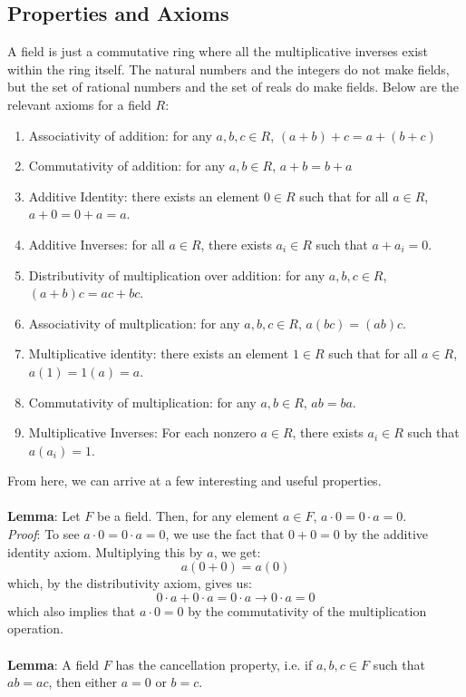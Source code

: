 \documentclass[11pt]{report}
\begin{document}
\subsection{Properties and Axioms}
A field is just a commutative ring where all the multiplicative inverses exist within the ring itself. The natural numbers and the integers do not make fields, but the set of rational numbers and the set of reals do make fields. Below are the relevant axioms for a field $R$:
\begin{enumerate}
\item Associativity of addition: for any $a,b,c \in R$, $(a+b)+c = a+(b+c)$
\item Commutativity of addition: for any $a,b \in R$, $a+b = b+a$
\item Additive Identity: there exists an element $0 \in R$ such that for all $a \in R$, $a + 0 = 0 + a = a$.
\item Additive Inverses: for all $a \in R$, there exists $a_i \in R$ such that $a + a_i = 0$.
\item Distributivity of multiplication over addition: for any $a,b,c \in R$, $(a+b)c = ac + bc$.
\item Associativity of multplication: for any $a,b,c \in R$, $a(bc)=(ab)c$.
\item Multiplicative identity: there exists an element $1 \in R$ such that for all $a \in R$, $a(1) = 1(a) = a$.
\item Commutativity of multiplication: for any $a,b \in R$, $ab = ba$.
\item Multiplicative Inverses: For each nonzero $a \in R$, there exists $a_i \in R$ such that $a(a_i) = 1$.
\end{enumerate}
From here, we can arrive at a few interesting and useful properties. \\ \pagebreak
\\ 
\textbf{Lemma}: Let $F$ be a field. Then, for any element $a \in F$, $a \cdot 0 = 0 \cdot a = 0$. \\
\textit{Proof}: To see $a \cdot 0 = 0 \cdot a = 0$, we use the fact that $0 + 0 = 0$ by the additive identity axiom. Multiplying this by $a$, we get:
$$a(0+0) = a(0)$$
which, by the distributivity axiom, gives us:
$$0 \cdot a + 0 \cdot a = 0 \cdot a \rightarrow 0 \cdot a = 0$$
which also implies that $a \cdot 0 = 0$ by the commutativity of the multiplication operation.
\\ \\
\textbf{Lemma}: A field $F$ has the cancellation property, i.e. if $a,b,c \in F$ such that $ab = ac$, then either $a = 0$ or $b = c$. \\
\end{document}
